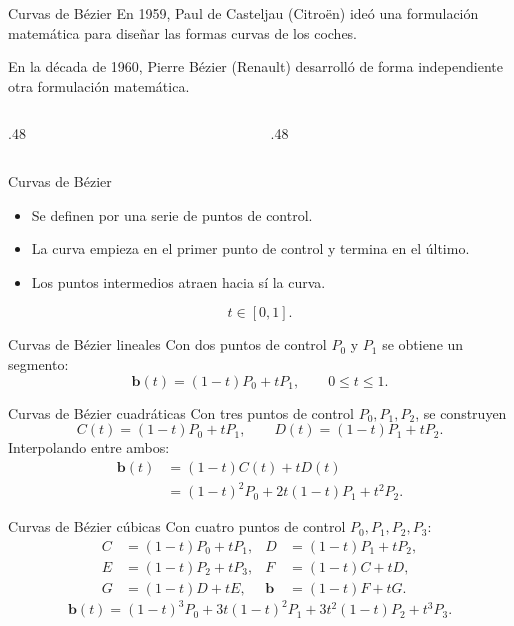 \documentclass[main.tex]{subfiles}
\begin{document}
\begin{frame}[t]{Curvas de Bézier}
En 1959, Paul de Casteljau (Citroën) ideó una formulación matemática para diseñar las formas curvas de los coches.\par\medskip En la década de 1960, Pierre Bézier (Renault) desarrolló de forma independiente otra formulación matemática.\begin{columns}[T]\begin{column}{.48\textwidth}\end{column}\begin{column}{.48\textwidth}\end{column}\end{columns}
\end{frame}

\begin{frame}[t]{Curvas de Bézier}
\begin{itemize}
\item Se definen por una serie de puntos de control.
\item La curva empieza en el primer punto de control y termina en el último.
\item Los puntos intermedios atraen hacia sí la curva.
\end{itemize}\[t\in[0,1].\]
\end{frame}

\begin{frame}[t]{Curvas de Bézier lineales}
Con dos puntos de control $P_0$ y $P_1$ se obtiene un segmento:\[\mathbf b(t)=(1-t)P_0+tP_1,\qquad 0\leq t\leq1.\]
\end{frame}

\begin{frame}[t]{Curvas de Bézier cuadráticas}
Con tres puntos de control $P_0,P_1,P_2$, se construyen\[C(t)=(1-t)P_0+tP_1,\qquad D(t)=(1-t)P_1+tP_2.\]Interpolando entre ambos:\[\begin{aligned}\mathbf b(t)&=(1-t)C(t)+tD(t)\\&=(1-t)^2P_0+2t(1-t)P_1+t^2P_2.\end{aligned}\]
\end{frame}

\begin{frame}[t]{Curvas de Bézier cúbicas}
\small Con cuatro puntos de control $P_0,P_1,P_2,P_3$:\[\begin{aligned}C&=(1-t)P_0+tP_1, &D&=(1-t)P_1+tP_2,\\ E&=(1-t)P_2+tP_3, &F&=(1-t)C+tD,\\ G&=(1-t)D+tE, &\mathbf b&=(1-t)F+tG.\end{aligned}\]\[\mathbf b(t)=(1-t)^3P_0+3t(1-t)^2P_1+3t^2(1-t)P_2+t^3P_3.\]
\end{frame}
\end{document}
